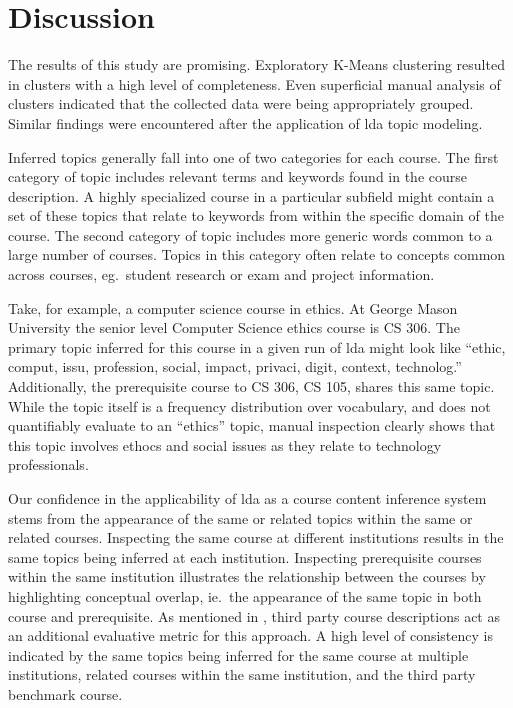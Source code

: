 \section{Discussion}
\label{sec:discussion}


The results of this study are promising.
Exploratory K-Means clustering resulted in clusters with a high level of completeness.
Even superficial manual analysis of clusters indicated that the collected data were being appropriately grouped.
Similar findings were encountered after the application of \ac{lda} topic modeling.


Inferred topics generally fall into one of two categories for each course.
The first category of topic includes relevant terms and keywords found in the course description.
A highly specialized course in a particular subfield might contain a set of these topics that relate to keywords from within the specific domain of the course.
The second category of topic includes more generic words common to a large number of courses.
Topics in this category often relate to concepts common across courses, eg.\ student research or exam and project information.


Take, for example, a computer science course in ethics.
At George Mason University the senior level Computer Science ethics course is CS 306.
The primary topic inferred for this course in a given run of \ac{lda} might look like ``ethic, comput, issu, profession, social, impact, privaci, digit, context, technolog.''
Additionally, the prerequisite course to CS 306, CS 105, shares this same topic.
While the topic itself is a frequency distribution over vocabulary, and does not quantifiably evaluate to an ``ethics'' topic, manual inspection clearly shows that this topic involves ethocs and social issues as they relate to technology professionals.


Our confidence in the applicability of \ac{lda} as a course content inference system stems from the appearance of the same or related topics within the same or related courses.
Inspecting the same course at different institutions results in the same topics being inferred at each institution.
Inspecting prerequisite courses within the same institution illustrates the relationship between the courses by highlighting conceptual overlap, ie.\ the appearance of the same topic in both course and prerequisite.
As mentioned in , third party course descriptions act as an additional evaluative metric for this approach.
A high level of consistency is indicated by the same topics being inferred for the same course at multiple institutions, related courses within the same institution, and the third party benchmark course.


